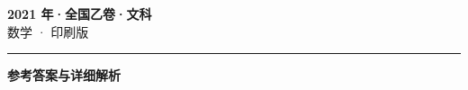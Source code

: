 \documentclass[zihao=5, a4paper]{ctexart}
\begin{document}
\begin{center}
  {\Large\bfseries 2021 年·全国乙卷·文科}\\[4pt]
  {\large 数学 · 印刷版}
\end{center}
\medskip
{}

\par\bigskip\hrule\bigskip
{}
\begin{center}{\large\bfseries 参考答案与详细解析}\end{center}
\smallskip

\end{document}
